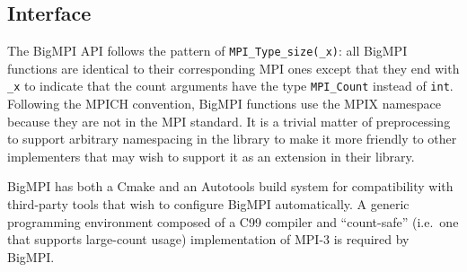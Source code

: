 
\subsection{Interface}

The BigMPI API follows the pattern of \texttt{MPI\_Type\_size(\_x)}: 
all BigMPI functions are identical to their corresponding MPI ones except that
they end with \texttt{\_x} to indicate that the count arguments have the type
\texttt{MPI\_Count} instead of \texttt{int}.
Following the MPICH convention, BigMPI functions use the 
MPIX namespace because they are not in the MPI standard.
It is a trivial matter of preprocessing to support arbitrary namespacing
in the library to make it more friendly to other implementers that
may wish to support it as an extension in their library.


BigMPI has both a Cmake and an Autotools build system for compatibility
with third-party tools that wish to configure BigMPI automatically.
A generic programming environment composed of a C99 compiler 
and ``count-safe'' (i.e.\  one that supports large-count usage) 
implementation of MPI-3 is required by BigMPI.
